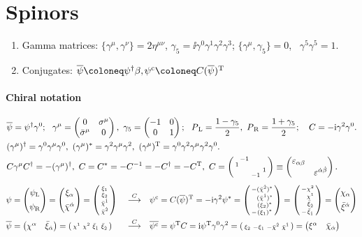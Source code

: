 \documentclass[CheatSheet]{subfiles}
\begin{document}
\summarystyle
\section{Spinors}
\begin{enumerate}[label={}]
  \item Gamma matrices: \quad
$\{\gamma^\mu,\gamma^\nu\}=2\eta^{\mu\nu}$,\quad
$\gamma_5=\ii\gamma^0\gamma^1\gamma^2\gamma^3$;\quad
$\{\gamma^\mu,\gamma_5\}=0$,~
$\gamma^5\gamma^5=1$.
 \item Conjugates: $\overline{\psi} \deq \psi^\dagger \beta,$\qquad $\psi^\cc\deq C(\overline\psi)^\TT$
\end{enumerate}

\paragraph{Chiral notation}
\begin{align}\label{eq:chiralnotation}
& \overline{\psi}=\psi^\dagger\gamma^0;~~
 \gamma^\mu=\begin{pmatrix}0&\sigma^\mu\\\bar\sigma^\mu&0\end{pmatrix},~
 \gamma_5=\begin{pmatrix}-1&0\\0&1\end{pmatrix};~~
 P_{\,\mathrm L} = \frac{1-\gamma_5}{2},~
 P_{\,\mathrm R} = \frac{1+\gamma_5}{2};\quad C=-{\mathrm{i}}\gamma^2\gamma^0.
\\&
(\gamma^\mu)^\dagger = \gamma^0\gamma^\mu\gamma^0,~
(\gamma^\mu)^*       = \gamma^2\gamma^\mu\gamma^2,~
(\gamma^\mu)^{\mathrm{T}}     = \gamma^0\gamma^2\gamma^\mu\gamma^2\gamma^0.
\\&
C\gamma^\mu C^\dagger = -(\gamma^\mu)^\dagger,~
C=C^*=-C^{-1}=-C^\dagger=-C^{\mathrm{T}},~
C = \left(\begin{smallmatrix}&\!-1\\1\\&&&1\\&&-1\end{smallmatrix}\right) \equiv \begin{pmatrix}\varepsilon_{\alpha\beta}\\&\varepsilon^{{\dot\alpha}{\dot\beta}}\end{pmatrix}.
\end{align}
 \begin{align}
  \psi&=\pmat{\psi\w L\\[.5em]\psi\w R}=\pmat{\xi_\alpha\\[.5em]\bar\chi^\dalpha}
       =\spmat{\xi_1\\\xi_2\\\bar\chi^{\dot1}\\\bar\chi^{\dot2}}&
  &\buildrel{C}\over{\longrightarrow}&
  \psi^\cc &=
  C(\overline\psi)^\TT=
  -\ii\gamma^2\psi^*=\spmat{-\!\!&(\bar\chi^{\dot2})^*\\&(\bar\chi^{\dot1})^*\\&(\xi_2)^*\\-\!\!&(\xi_1)^*}
               =\spmat{-\!\!&\chi^2 \\ &\chi^1\\&\bar\xi_{\dot2}\\ -\!\!&\bar\xi_{\dot1}}
               =\pmat{\chi_\alpha \\[.5em] \bar\xi^\dalpha}\\
  \overline\psi&=\pmat{\chi^\alpha&\bar\xi_\dalpha}
          =\spmat{\chi^1&\chi^2&\bar\xi_{\dot 1}&\bar\xi_{\dot 2}}&
  &\buildrel{C}\over{\longrightarrow}&
  \overline{\psi^\cc} &=\psi^\TT C=\ii\psi^\TT\gamma^0\gamma^2
                =\spmat{\xi_2&-\xi_1&-\bar\chi^{\dot2}&\bar\chi^{\dot1}}
                =\pmat{\xi^\alpha&\bar\chi_{\dalpha}}
  \end{align}
\end{document}
